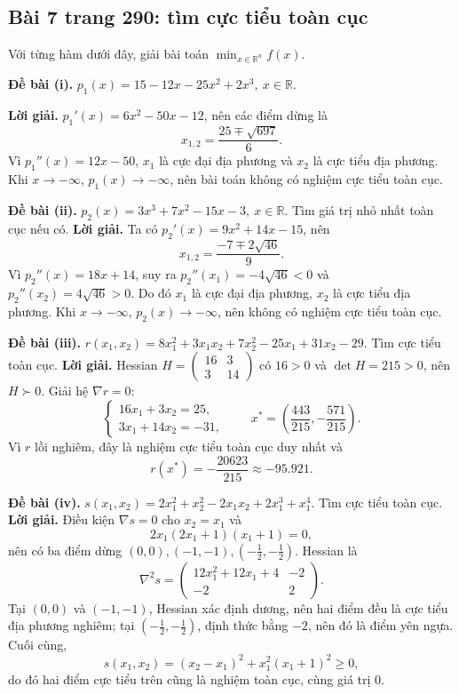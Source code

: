 \documentclass[11pt,a4paper]{article}
\newcommand{\R}{\mathbb{R}}
\newcommand{\grad}{\nabla}
\newcommand{\Hess}{\nabla^2}
\begin{document}
\subsection{Bài 7 trang 290: tìm cực tiểu toàn cục}
Với từng hàm dưới đây, giải bài toán \(\min_{x\in\R^n} f(x)\).
\begin{samepage}
\textbf{Đề bài (i).} \(p_1(x)=15-12x-25x^2+2x^3,\ x\in\R\).

\textbf{Lời giải.} \(p_1'(x)=6x^2-50x-12\), nên các điểm dừng là
\[
x_{1,2}=\frac{25\mp\sqrt{697}}6.
\]
Vì \(p_1''(x)=12x-50\), \(x_1\) là cực đại địa phương và \(x_2\) là cực tiểu địa phương. Khi \(x\to-\infty\), \(p_1(x)\to-\infty\), nên bài toán không có nghiệm cực tiểu toàn cục.
\end{samepage}
\begin{samepage}
\textbf{Đề bài (ii).} \(p_2(x)=3x^3+7x^2-15x-3,\ x\in\R\). Tìm giá trị nhỏ nhất toàn cục nếu có.
\textbf{Lời giải.} Ta có \(p_2'(x)=9x^2+14x-15\), nên
\[
x_{1,2}=\frac{-7\mp2\sqrt{46}}9.
\]
Vì \(p_2''(x)=18x+14\), suy ra \(p_2''(x_1)=-4\sqrt{46}<0\) và \(p_2''(x_2)=4\sqrt{46}>0\). Do đó \(x_1\) là cực đại địa phương, \(x_2\) là cực tiểu địa phương. Khi \(x\to-\infty\), \(p_2(x)\to-\infty\), nên không có nghiệm cực tiểu toàn cục.

\end{samepage}
\begin{samepage}
\textbf{Đề bài (iii).} \(r(x_1,x_2)=8x_1^2+3x_1x_2+7x_2^2-25x_1+31x_2-29\). Tìm cực tiểu toàn cục.
\textbf{Lời giải.} Hessian \(H=\begin{pmatrix}16&3\\3&14\end{pmatrix}\) có \(16>0\) và \(\det H=215>0\), nên \(H\succ0\). Giải hệ \(\grad r=0\):
\[
\begin{cases}
16x_1+3x_2=25,\\
3x_1+14x_2=-31,
\end{cases}
\qquad
x^*=\left(\frac{443}{215},-\frac{571}{215}\right).
\]
Vì \(r\) lồi nghiêm, đây là nghiệm cực tiểu toàn cục duy nhất và
\[
r(x^*)=-\frac{20623}{215}\approx-95.921.
\]

\end{samepage}
\begin{samepage}
\textbf{Đề bài (iv).} \(s(x_1,x_2)=2x_1^2+x_2^2-2x_1x_2+2x_1^3+x_1^4\). Tìm cực tiểu toàn cục.
\textbf{Lời giải.} Điều kiện \(\grad s=0\) cho \(x_2=x_1\) và
\[
2x_1(2x_1+1)(x_1+1)=0,
\]
nên có ba điểm dừng \((0,0),(-1,-1),(-\tfrac12,-\tfrac12)\). Hessian là
\[
\Hess s=\begin{pmatrix}12x_1^2+12x_1+4&-2\\-2&2\end{pmatrix}.
\]
Tại \((0,0)\) và \((-1,-1)\), Hessian xác định dương, nên hai điểm đều là cực tiểu địa phương nghiêm; tại \((-\tfrac12,-\tfrac12)\), định thức bằng \(-2\), nên đó là điểm yên ngựa. Cuối cùng,
\[
s(x_1,x_2)=(x_2-x_1)^2+x_1^2(x_1+1)^2\ge0,
\]
do đó hai điểm cực tiểu trên cũng là nghiệm toàn cục, cùng giá trị \(0\).
\end{samepage}
\end{document}
